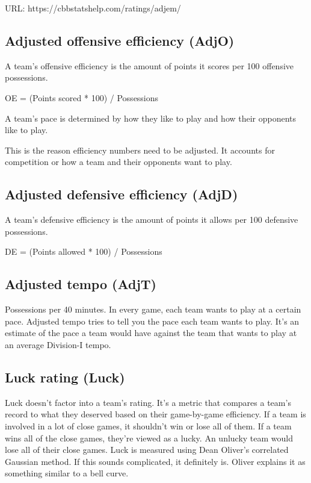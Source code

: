 \documentclass[
10pt, %
a4paper, %
oneside, %
headinclude,footinclude, %
BCOR5mm, %
]{scrartcl}
\begin{document}
\begin{description}
\begin{description}
URL: https://cbbstatshelp.com/ratings/adjem/
\end{description}

\subsection{Adjusted offensive efficiency (AdjO)}
\begin{description}
	A team's offensive efficiency is the amount of points it scores per 100 offensive possessions.
	
	OE = (Points scored * 100) / Possessions
	
	A team's pace is determined by how they like to play and how their opponents like to play.
	
	This is the reason efficiency numbers need to be adjusted. It accounts for competition or how a team and their opponents want to play.
\end{description}

\subsection{Adjusted defensive efficiency (AdjD)}
\begin{description}
	A team's defensive efficiency is the amount of points it allows per 100 defensive possessions.
	
	DE = (Points allowed * 100) / Possessions
\end{description}

\subsection{Adjusted tempo (AdjT)}
\begin{description}
	Possessions per 40 minutes.
	In every game, each team wants to play at a certain pace. Adjusted tempo tries to tell you the pace each team wants to play.
	It's an estimate of the pace a team would have against the team that wants to play at an average Division-I tempo.
\end{description}

\subsection{Luck rating (Luck)}
\begin{description}
Luck doesn't factor into a team's rating. It's a metric that compares a team's record to what they deserved based on their game-by-game efficiency.
If a team is involved in a lot of close games, it shouldn't win or lose all of them. If a team wins all of the close games, they're viewed as a lucky. An unlucky team would lose all of their close games.
Luck is measured using Dean Oliver's correlated Gaussian method.
If this sounds complicated, it definitely is.
Oliver explains it as something similar to a bell curve.


\end{description}
\end{description}
\end{document}
